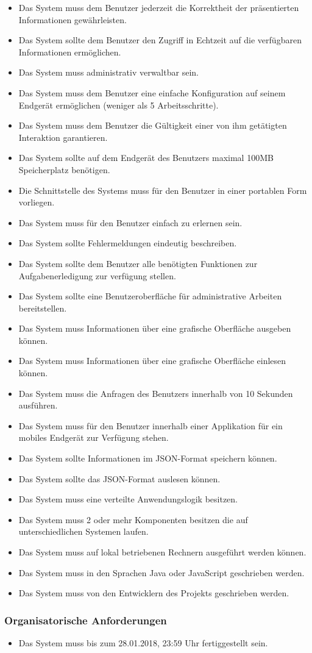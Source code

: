 \begin{itemize}
	\item Das System muss dem Benutzer jederzeit die Korrektheit der präsentierten Informationen gewährleisten.
	\item Das System sollte dem Benutzer den Zugriff in Echtzeit auf die verfügbaren Informationen ermöglichen.
	\item Das System muss administrativ verwaltbar sein.
	\item Das System muss dem Benutzer eine einfache Konfiguration auf seinem Endgerät ermöglichen (weniger als 5 Arbeitsschritte).
	\item Das System muss dem Benutzer die Gültigkeit einer von ihm getätigten Interaktion garantieren.
	\item Das System sollte auf dem Endgerät des Benutzers maximal 100MB Speicherplatz benötigen.
	\item Die Schnittstelle des Systems muss für den Benutzer in einer portablen Form vorliegen.
	\item Das System muss für den Benutzer einfach zu erlernen sein.
	\item Das System sollte Fehlermeldungen eindeutig beschreiben.
	\item Das System sollte dem Benutzer alle benötigten Funktionen zur Aufgabenerledigung zur verfügung stellen.

	\item Das System sollte eine Benutzeroberfläche für administrative Arbeiten bereitstellen.   
	\item Das System muss Informationen über eine grafische Oberfläche ausgeben können.
	\item Das System muss Informationen über eine grafische Oberfläche einlesen können.
	\item Das System muss die Anfragen des Benutzers innerhalb von 10 Sekunden ausführen.
	\item Das System muss für den Benutzer innerhalb einer Applikation für ein mobiles Endgerät zur Verfügung stehen.
	\item Das System sollte Informationen im JSON-Format speichern können.
	\item Das System sollte das JSON-Format auslesen können.

	\item Das System muss eine verteilte Anwendungslogik besitzen.
	\item Das System muss 2 oder mehr Komponenten besitzen die auf unterschiedlichen Systemen laufen.
	\item Das System muss auf lokal betriebenen Rechnern ausgeführt werden können.
	\item Das System muss in den Sprachen Java oder JavaScript geschrieben werden.
	\item Das System muss von den Entwicklern des Projekts geschrieben werden. 
\end{itemize}

\subsubsection{Organisatorische Anforderungen}
\label{sec:Organisatorische_Anforderungen}

\begin{itemize}
	\item Das System muss bis zum 28.01.2018, 23:59 Uhr fertiggestellt sein.
\end{itemize}
